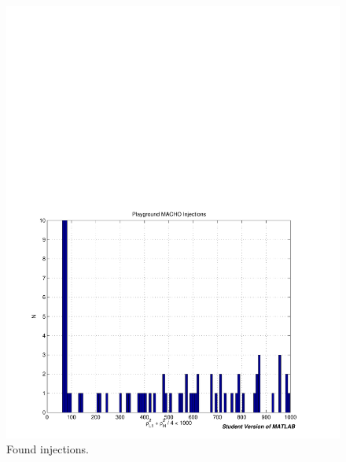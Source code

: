 \begin{figure}[p]
\begin{center}
\includegraphics[width=\textwidth]{analysis/figures/inj_hist_lo}
\end{center}
\caption{\label{f:inj_hist_lo}%
Found injections.
}
\end{figure}

